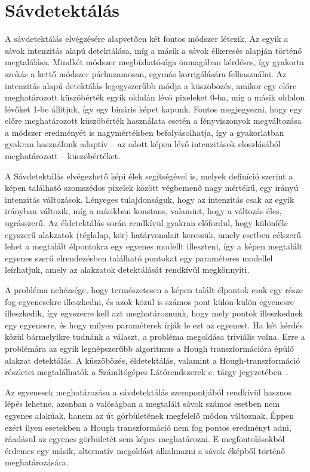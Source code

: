 \documentclass[12pt,a4paper,oneside]{report}             %
\begin{document}
\section{Sávdetektálás}

A sávdetektálás elvégzésére alapvetően két fontos módszer létezik. Az egyik a sávok intenzitás alapú detektálása, míg a másik a sávok élkeresés alapján történő megtalálása. Mindkét módszer megbízhatósága önmagában kérdéses, így gyakorta szokás a kettő módszer párhuzamosan, egymás korrigálására felhasználni. Az intenzitás alapú detektálás legegyszerűbb módja a küszöbözés, amikor egy előre meghatározott küszöbérték egyik oldalán lévő pixeleket 0-ba, míg a másik oldalon lévőket 1-be állítjuk, így egy bináris képet kapunk. Fontos megjegyezni, hogy egy előre meghatározott küszöbérték használata esetén a fényviszonyok megváltozása a módszer eredményét is nagymértékben befolyásolhatja, így a gyakorlatban gyakran használunk adaptív – az adott képen lévő intenzitások eloszlásából meghatározott – küszöbértéket. 

A Sávdetektálás elvégezhető képi élek segítségével is, melyek definíció szerint a képen található szomszédos pixelek között végbemenő nagy mértékű, egy irányú intenzitás változások. Lényeges tulajdonságuk, hogy az intenzitás csak az egyik irányban változik, míg a másikban konstans, valamint, hogy a változás éles, ugrásszerű. Az éldetektálás során rendkívül gyakran előfordul, hogy különféle egyszerű alakzatok (téglalap, kör) határvonalait keressük, amely esetben célszerű lehet a megtalált élpontokra egy egyenes modellt illeszteni, így a képen megtalált egyenes szerű elrendezésben található pontokat egy paraméteres modellel leírhatjuk, amely az alakzatok detektálását rendkívül megkönnyíti.

A probléma nehézsége, hogy természetesen a képen talált élpontok csak egy része fog egyenesekre illeszkedni, és azok közül is számos pont külön-külön egyenesre illeszkedik, így egyszerre kell azt meghatároznunk, hogy mely pontok illeszkednek egy egyenesre, és hogy milyen paraméterek írják le ezt az egyenest. Ha két kérdés közül bármelyikre tudnánk a választ, a probléma megoldása triviális volna.
 Erre a problémára az egyik legnépszerűbb algoritmus a Hough transzformációra épülő alakzat detektálás. A küszöbözés, éldetektálás, valamint a Hough-transzformáció részletei megtalálhatók a Számítógépes Látórendszerek c. tárgy jegyzetében~\cite{szgl}.

Az egyenesek meghatározása a sávdetektálás szempontjából rendkívül hasznos lépés lehetne, azonban a valóságban a megtalált sávok számos esetben nem egyenes alakúak, hanem az út görbületének megfelelő módon változnak. Éppen ezért ilyen esetekben a Hough transzformáció nem fog pontos eredményt adni, ráadásul az egyenes görbületét sem képes meghatározni. E megfontolásokból érdemes egy másik, alternatív megoldást alkalmazni a sávok éképből történő meghatározására. 
\end{document}
